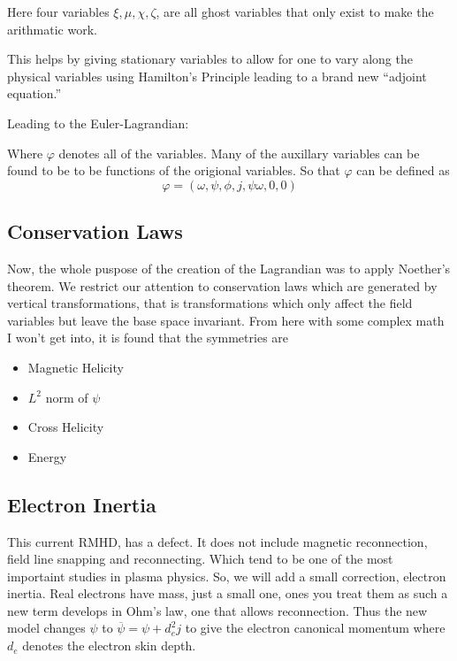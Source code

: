  Here four variables $ \xi, \mu, \chi, \zeta $, are all ghost variables that only exist to make the arithmatic work.

This helps by giving stationary variables to allow for one to vary along the physical variables using Hamilton's Principle leading to a brand new ``adjoint equation.''

Leading to the Euler-Lagrandian:


  Where $\varphi$ denotes all of the variables. Many of the auxillary variables can be found to be to be functions of the origional variables. So that $\varphi$ can be defined as
\[
\varphi = (\omega, \psi, \phi, j, \psi \omega, 0,0)
  \]

\subsection{Conservation Laws}

Now, the whole puspose of the creation of the Lagrandian was to apply Noether's theorem. We restrict our attention to conservation laws which are generated by vertical
transformations, that is transformations which only affect the field variables but leave the base space invariant. From here with some complex math I won't get into, it is found that the symmetries are
\begin{itemize}
  \item Magnetic Helicity
  \item $L^2$ norm of $\psi$
  \item Cross Helicity
  \item Energy
\end{itemize}

\subsection{Electron Inertia}
This current RMHD, has a defect. It does not include magnetic reconnection, field line snapping and reconnecting. Which tend to be one of the most importaint studies in plasma physics. So, we will add a small correction, electron inertia. Real electrons have mass, just a small one, ones you treat them as such a new term develops in Ohm's law, one that allows reconnection.
Thus the new model changes $\psi$ to $\overline{\psi}= \psi+d^2_e j$ to give the electron canonical momentum where $d_e$ denotes the electron skin depth.

